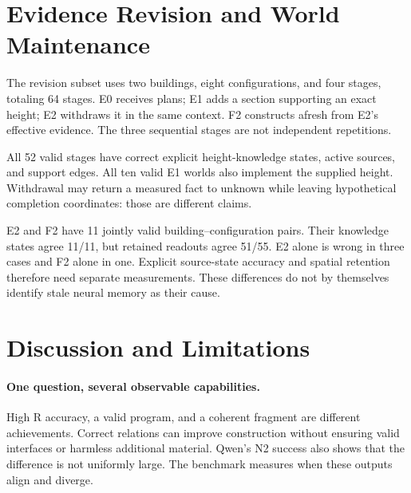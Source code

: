 \section{Evidence Revision and World Maintenance}
\label{sec:revision}

\begin{center}
\label{fig:revision}
\end{center}

The revision subset uses two buildings, eight configurations, and four
stages, totaling 64 stages. E0 receives plans; E1 adds a section
supporting an exact height; E2 withdraws it in the same context.
F2 constructs afresh from E2's effective evidence. The three sequential
stages are not independent repetitions.

\begin{center}
\small

\label{tab:revision}
\end{center}

All 52 valid stages have correct explicit height-knowledge states,
active sources, and support edges. All ten valid E1 worlds also
implement the supplied height. Withdrawal may return a measured
fact to unknown while leaving hypothetical completion coordinates:
those are different claims.

E2 and F2 have 11 jointly valid building--configuration pairs.
Their knowledge states agree 11/11, but retained readouts agree
51/55. E2 alone is wrong in three cases and F2 alone in one.
Explicit source-state accuracy and spatial retention therefore need
separate measurements. These differences do not by themselves
identify stale neural memory as their cause.

\section{Discussion and Limitations}
\label{sec:discussion}
\paragraph{One question, several observable capabilities.}
High R accuracy, a valid program, and a coherent fragment are different
achievements. Correct relations can improve construction without
ensuring valid interfaces or harmless additional material.
Qwen's N2 success also shows that the difference is not uniformly
large. The benchmark measures when these outputs align and diverge.

